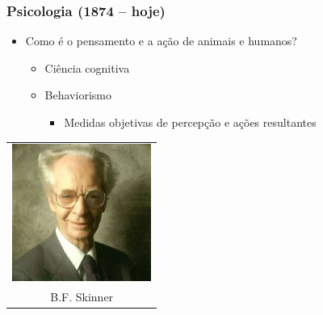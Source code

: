 \documentclass[aspectratio=169]{beamer}
\begin{document}
	\begin{frame}
		\frametitle{Psicologia (1874 – hoje)}
		\begin{itemize}
			\item Como é o pensamento e a ação de animais e humanos?
			\begin{itemize}
				\item Ciência cognitiva
				\item Behaviorismo
				\begin{itemize}
					\item Medidas objetivas de percepção e ações resultantes

				\end{itemize}
			\end{itemize}
		\end{itemize}
		
		\begin{table}
			\centering
			\begin{tabular}{c}				
				\includegraphics[height=4.5cm, keepaspectratio]{../figs/cap01/skinner.jpg} \\
				B.F. Skinner 		
				
			\end{tabular}
		\end{table}
	\end{frame}	
\end{document}
